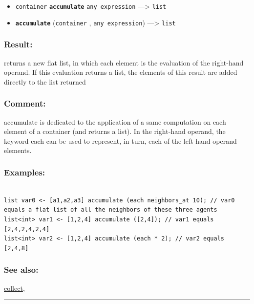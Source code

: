 \documentclass[]{book}
\providecommand{\tightlist}{%
  \setlength{\itemsep}{0pt}\setlength{\parskip}{0pt}}
\theoremstyle{definition}
\theoremstyle{definition}
\theoremstyle{definition}
\theoremstyle{remark}
\begin{document}
\begin{itemize}
\tightlist
\item
  \texttt{container} \textbf{\texttt{accumulate}}
  \texttt{any\ expression} ---\textgreater{} \texttt{list}
\item
  \textbf{\texttt{accumulate}} (\texttt{container} ,
  \texttt{any\ expression}) ---\textgreater{} \texttt{list}
\end{itemize}

\subsubsection{Result:}\label{result-16}

returns a new flat list, in which each element is the evaluation of the
right-hand operand. If this evaluation returns a list, the elements of
this result are added directly to the list returned

\subsubsection{Comment:}\label{comment-2}

accumulate is dedicated to the application of a same computation on each
element of a container (and returns a list). In the right-hand operand,
the keyword each can be used to represent, in turn, each of the
left-hand operand elements.

\subsubsection{Examples:}\label{examples-13}

\begin{verbatim}
 
list var0 <- [a1,a2,a3] accumulate (each neighbors_at 10); // var0 equals a flat list of all the neighbors of these three agents 
list<int> var1 <- [1,2,4] accumulate ([2,4]); // var1 equals [2,4,2,4,2,4] 
list<int> var2 <- [1,2,4] accumulate (each * 2); // var2 equals [2,4,8]
\end{verbatim}

\subsubsection{See also:}\label{see-also-14}

\href{operators-b-to-c.html\#collect}{collect},

\begin{center}\rule{0.5\linewidth}{\linethickness}\end{center}
\end{document}
